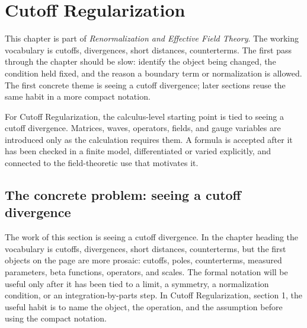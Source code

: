 \chapter{Cutoff Regularization}


This chapter is part of \emph{Renormalization and Effective Field Theory}.  The working vocabulary is cutoffs, divergences, short distances, counterterms.  The first pass through the chapter should be slow: identify the object being changed, the condition held fixed, and the reason a boundary term or normalization is allowed.  The first concrete theme is seeing a cutoff divergence; later sections reuse the same habit in a more compact notation.

For Cutoff Regularization, the calculus-level starting point is tied to seeing a cutoff divergence.  Matrices, waves, operators, fields, and gauge variables are introduced only as the calculation requires them.  A formula is accepted after it has been checked in a finite model, differentiated or varied explicitly, and connected to the field-theoretic use that motivates it.

\section{The concrete problem: seeing a cutoff divergence}













The work of this section is seeing a cutoff divergence.  In the chapter heading the vocabulary is cutoffs, divergences, short distances, counterterms, but the first objects on the page are more prosaic: cutoffs, poles, counterterms, measured parameters, beta functions, operators, and scales.  The formal notation will be useful only after it has been tied to a limit, a symmetry, a normalization condition, or an integration-by-parts step.  In Cutoff Regularization, section 1, the useful habit is to name the object, the operation, and the assumption before using the compact notation.

